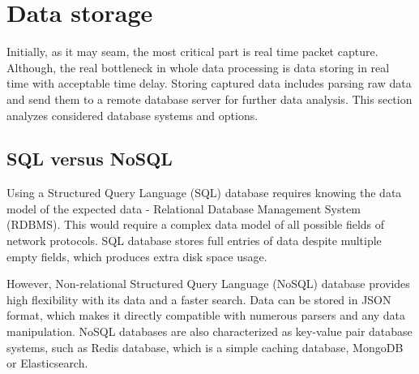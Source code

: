 \documentclass[12pt,a4paper,twoside]{report}
\begin{document}
	\section{Data storage} \label{analysis:storage}
		Initially, as it may seam, the most critical part is real time packet capture. Although, the real bottleneck in whole data processing is data storing in real time with acceptable time delay. Storing captured data includes parsing raw data and send them to a remote database server for further data analysis. This section analyzes considered database systems and options.
		\subsection{SQL versus NoSQL} \label{analysis:storage:sql}
			Using a Structured Query Language (SQL) database requires knowing the data model of the expected data - Relational Database Management System (RDBMS). This would require a complex data model of all possible fields of network protocols. SQL database stores full entries of data despite multiple empty fields, which produces extra disk space usage.\par
			However, Non-relational Structured Query Language (NoSQL) database provides high flexibility with its data and a faster search. Data can be stored in JSON format, which makes it directly compatible with numerous parsers and any data manipulation. NoSQL databases are also characterized as key-value pair database systems, such as Redis database, which is a simple caching database, MongoDB or Elasticsearch.
\end{document}

